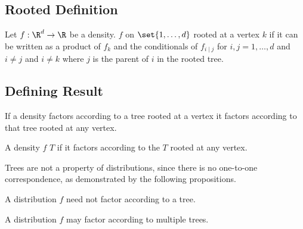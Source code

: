 
\sbasic


































\sstart
{}



\subsection{Rooted Definition}

Let $f: \R^d \to \R$ be a density.
$f$
on $\set{1, \dots, d}$ rooted
at a vertex $k$ if it can be
written as a product of $f_k$
and the conditionals of $f_{i \mid j}$
for $i,j = 1, \dots, d$ and $i \neq j$
and $i \neq k$ where $j$ is the parent
of $i$ in the rooted tree.

\subsection{Defining Result}
\begin{prop}
If a density factors according
to a tree rooted at a vertex it
factors according to that tree rooted
at any vertex.
\end{prop}


A density $f$
 $T$
if it factors according to the
$T$ rooted at any vertex.


Trees are not a property of distributions,
since there is no one-to-one correspondence,
as demonstrated by the following propositions.


A distribution $f$ need not factor according to a tree.

A distribution
$f$ may factor according to multiple trees.
\strats

